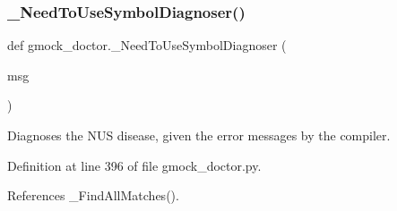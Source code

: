 \mbox{\label{namespacegmock__doctor_a9ee9925aa81453f121d44e0ad8f1bbaf}} 
\subsubsection{\texorpdfstring{\+\_\+\+Need\+To\+Use\+Symbol\+Diagnoser()}{\_NeedToUseSymbolDiagnoser()}}
{\footnotesize\ttfamily def gmock\+\_\+doctor.\+\_\+\+Need\+To\+Use\+Symbol\+Diagnoser (\begin{DoxyParamCaption}\item[{}]{msg }\end{DoxyParamCaption})\hspace{0.3cm}{\ttfamily [private]}}

\begin{DoxyVerb}Diagnoses the NUS disease, given the error messages by the compiler.\end{DoxyVerb}
 

Definition at line 396 of file gmock\+\_\+doctor.\+py.



References \+\_\+\+Find\+All\+Matches().


